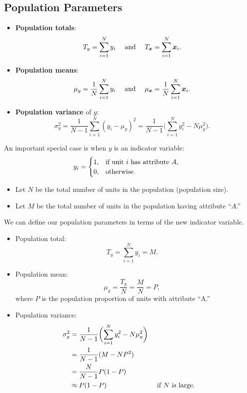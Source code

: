\subsection*{Population Parameters}
\begin{Regular}{}
    \begin{itemize}
        \item \textbf{Population totals}:
              \[ T_y=\sum_{i=1}^{N}y_i\quad\text{ and }\quad T_{\bm{x}}=\sum_{i=1}^{N}\bm{x}_i. \]
        \item \textbf{Population means}:
              \[ \mu_y=\frac{1}{N}\sum_{i=1}^{N}y_i\quad\text{ and }\quad \mu_{\bm{x}}=\frac{1}{N}\sum_{i=1}^{N}\bm{x}_i. \]
        \item \textbf{Population variance} of $ y $:
              \[ \sigma_y^2=\frac{1}{N-1}\sum_{i=1}^{N}(y_i-\mu_y)^2
                  =\frac{1}{N-1}\biggl(\sum_{i=1}^{N}y_i^2-N\mu_y^2\biggr). \]
    \end{itemize}
\end{Regular}
\begin{Regular}{}
    An important special case is when $y$ is an indicator variable:
    \[ y_i=\begin{cases}
            1, & \text{if unit $ i $ has attribute $A$}, \\
            0, & \text{otherwise}.
        \end{cases} \]
    \begin{itemize}
        \item Let $ N $ be the total number of units in the population (population size).
        \item Let $ M $ be the total number of units in the population having attribute ``$A$.''
    \end{itemize}
    \tcblower{}
    We can define our population parameters in terms of the new indicator variable.
    \begin{itemize}
        \item Population total:
              \[ T_y=\sum_{i=1}^{N}y_i=M. \]
        \item Population mean:
              \[ \mu_y=\frac{T_y}{N}=\frac{M}{N}=P, \]
              where $ P $ is the population proportion of units with attribute ``A.''
        \item Population variance:
              \begin{align*}
                  \sigma_y^2
                   & =\frac{1}{N-1}\biggl(\sum_{i=1}^{N}y_i^2-N\mu_y^2\biggr)                                 \\
                   & =\frac{1}{N-1}(M-NP^2)                                                                   \\
                   & =\frac{N}{N-1}P(1-P)                                                                     \\
                   & \approx P(1-P)                                           &  & \text{ if $ N $ is large}.
              \end{align*}
    \end{itemize}
\end{Regular}

